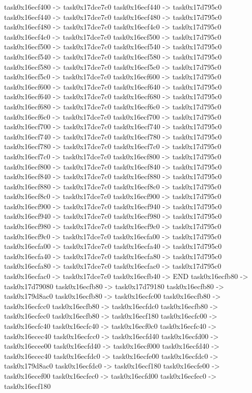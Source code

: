 {	task0x16ecf400 -> task0x17dce7c0
	task0x16ecf440 -> task0x17d795c0
	task0x16ecf440 -> task0x17dce7c0
	task0x16ecf480 -> task0x17d795c0
	task0x16ecf480 -> task0x17dce7c0
	task0x16ecf4c0 -> task0x17d795c0
	task0x16ecf4c0 -> task0x17dce7c0
	task0x16ecf500 -> task0x17d795c0
	task0x16ecf500 -> task0x17dce7c0
	task0x16ecf540 -> task0x17d795c0
	task0x16ecf540 -> task0x17dce7c0
	task0x16ecf580 -> task0x17d795c0
	task0x16ecf580 -> task0x17dce7c0
	task0x16ecf5c0 -> task0x17d795c0
	task0x16ecf5c0 -> task0x17dce7c0
	task0x16ecf600 -> task0x17d795c0
	task0x16ecf600 -> task0x17dce7c0
	task0x16ecf640 -> task0x17d795c0
	task0x16ecf640 -> task0x17dce7c0
	task0x16ecf680 -> task0x17d795c0
	task0x16ecf680 -> task0x17dce7c0
	task0x16ecf6c0 -> task0x17d795c0
	task0x16ecf6c0 -> task0x17dce7c0
	task0x16ecf700 -> task0x17d795c0
	task0x16ecf700 -> task0x17dce7c0
	task0x16ecf740 -> task0x17d795c0
	task0x16ecf740 -> task0x17dce7c0
	task0x16ecf780 -> task0x17d795c0
	task0x16ecf780 -> task0x17dce7c0
	task0x16ecf7c0 -> task0x17d795c0
	task0x16ecf7c0 -> task0x17dce7c0
	task0x16ecf800 -> task0x17d795c0
	task0x16ecf800 -> task0x17dce7c0
	task0x16ecf840 -> task0x17d795c0
	task0x16ecf840 -> task0x17dce7c0
	task0x16ecf880 -> task0x17d795c0
	task0x16ecf880 -> task0x17dce7c0
	task0x16ecf8c0 -> task0x17d795c0
	task0x16ecf8c0 -> task0x17dce7c0
	task0x16ecf900 -> task0x17d795c0
	task0x16ecf900 -> task0x17dce7c0
	task0x16ecf940 -> task0x17d795c0
	task0x16ecf940 -> task0x17dce7c0
	task0x16ecf980 -> task0x17d795c0
	task0x16ecf980 -> task0x17dce7c0
	task0x16ecf9c0 -> task0x17d795c0
	task0x16ecf9c0 -> task0x17dce7c0
	task0x16ecfa00 -> task0x17d795c0
	task0x16ecfa00 -> task0x17dce7c0
	task0x16ecfa40 -> task0x17d795c0
	task0x16ecfa40 -> task0x17dce7c0
	task0x16ecfa80 -> task0x17d795c0
	task0x16ecfa80 -> task0x17dce7c0
	task0x16ecfac0 -> task0x17d795c0
	task0x16ecfac0 -> task0x17dce7c0
	task0x16ecfb40 -> END
	task0x16ecfb80 -> task0x17d79080
	task0x16ecfb80 -> task0x17d79180
	task0x16ecfb80 -> task0x179d8ac0
	task0x16ecfb80 -> task0x16ecfc00
	task0x16ecfb80 -> task0x16ecfcc0
	task0x16ecfb80 -> task0x16ecfdc0
	task0x16ecfb80 -> task0x16ecfec0
	task0x16ecfb80 -> task0x16ecf180
	task0x16ecfc00 -> task0x16ecfc40
	task0x16ecfc40 -> task0x16ecf0c0
	task0x16ecfc40 -> task0x16ecec40
	task0x16ecfcc0 -> task0x16ecfd40
	task0x16ecfd00 -> task0x16ecee00
	task0x16ecfd40 -> task0x16ecf000
	task0x16ecfd40 -> task0x16ecec40
	task0x16ecfdc0 -> task0x16ecfe00
	task0x16ecfdc0 -> task0x179d8ac0
	task0x16ecfdc0 -> task0x16ecf180
	task0x16ecfe00 -> task0x16ecef00
	task0x16ecfec0 -> task0x16ecfd00
	task0x16ecfec0 -> task0x16ecf180
}
